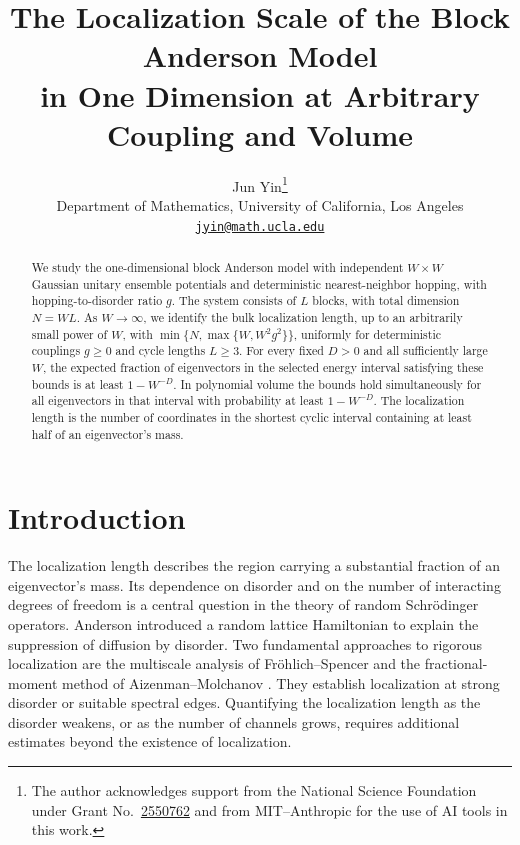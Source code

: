 \documentclass[11pt]{article}
\title{The Localization Scale of the Block Anderson Model\\
in One Dimension at Arbitrary Coupling and Volume}
\author{Jun Yin\thanks{The author acknowledges support from the National Science Foundation
under Grant No.~\href{https://www.nsf.gov/awardsearch/show-award?AWD_ID=2550762}{2550762}
and from MIT--Anthropic for the use of AI tools in this work.}\\
\small Department of Mathematics, University of California, Los Angeles\\
\small\href{mailto:jyin@math.ucla.edu}{\texttt{jyin@math.ucla.edu}}}
\date{}
\numberwithin{equation}{section}
\theoremstyle{remark}
\begin{document}
\maketitle
\begin{abstract}
We study the one-dimensional block Anderson model with independent
\(W\times W\) Gaussian unitary ensemble potentials and deterministic
nearest-neighbor hopping, with hopping-to-disorder ratio \(g\).
The system consists of \(L\) blocks,
with total dimension \(N=WL\). As \(W\to\infty\), we identify the bulk localization
length, up to an arbitrarily small power of \(W\), with
\(\min\{N,\max\{W,W^2g^2\}\}\), uniformly for deterministic
couplings $g\ge0$ and cycle lengths $L\ge3$. For every fixed $D>0$ and
all sufficiently large $W$, the expected fraction of eigenvectors in the
selected energy interval satisfying these bounds is at least $1-W^{-D}$.
In polynomial volume the bounds hold simultaneously for all eigenvectors
in that interval with probability at least $1-W^{-D}$. The localization
length is the number of coordinates in the shortest cyclic interval
containing at least half of an eigenvector's mass.
\end{abstract}

\tableofcontents
\clearpage

\section{Introduction}
\label{sec:components}

The localization length describes the region carrying a substantial
fraction of an eigenvector's mass. Its dependence on disorder and on the
number of interacting degrees of freedom is a central question in the
theory of random Schr\"odinger operators. Anderson \cite{Anderson}
introduced a random lattice Hamiltonian to explain the suppression of
diffusion by disorder. Two fundamental
approaches to rigorous localization are the multiscale analysis of
Fr\"ohlich--Spencer \cite{FS} and the fractional-moment method of
Aizenman--Molchanov \cite{AM}. They establish localization at strong
disorder or suitable spectral edges. Quantifying the localization length
as the disorder weakens, or as the number of channels grows, requires
additional estimates beyond the existence of localization.
\end{document}
